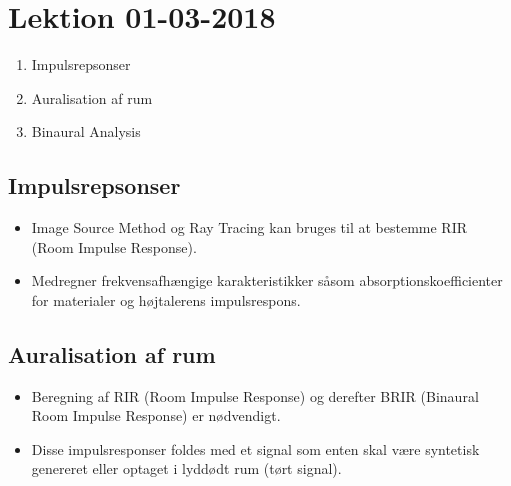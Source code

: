 \section{Lektion 01-03-2018}

\begin{enumerate}
	\item Impulsrepsonser
	\item Auralisation af rum
	\item Binaural Analysis
\end{enumerate}

\noindent{} \vspace{3mm}


\subsection{Impulsrepsonser}
\begin{itemize}
	\item Image Source Method og Ray Tracing kan bruges til at bestemme RIR (Room Impulse Response).
	\item Medregner frekvensafhængige karakteristikker såsom absorptionskoefficienter for materialer og højtalerens impulsrespons.
\end{itemize}
\newpage

\subsection{Auralisation af rum}
\begin{itemize}
	\item Beregning af RIR (Room Impulse Response) og derefter BRIR (Binaural Room Impulse Response) er nødvendigt.
	\item Disse impulsresponser foldes med et signal som enten skal være syntetisk genereret eller optaget i lyddødt rum (tørt signal). 
\end{itemize}

